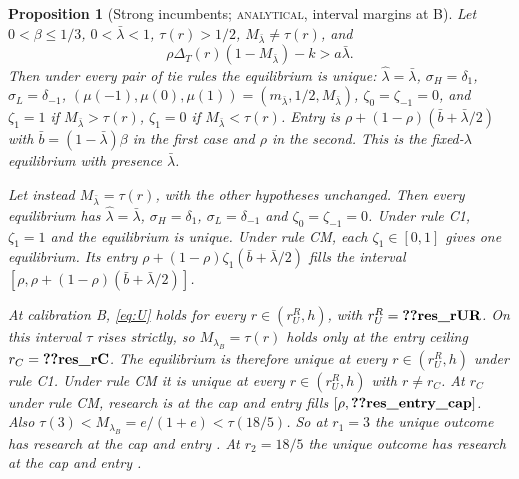 \documentclass[12pt]{article}
\newtheorem{proposition}{Proposition}
\theoremstyle{definition}
\theoremstyle{remark}
\newcommand{\DT}{\Delta_T}
\newcommand{\lh}{\hat\lambda}
\newcommand{\lb}{\bar\lambda}
\newcommand{\st}[1]{\textsc{#1}}
\begin{document}
\begin{proposition}[Strong incumbents; \st{analytical}, interval margins at B]\label{prop:strong}
Let $0<\beta\le1/3$, $0<\lb<1$, $\tau(r)>1/2$, $M_{\lb}\ne\tau(r)$, and
\begin{equation}\tag{U}\label{eq:U}
\rho\DT(r)\left(1-M_{\lb}\right)-k>a\lb .
\end{equation}
Then under every pair of tie rules the equilibrium is unique: $\lh=\lb$, $\sigma_H=\delta_1$, $\sigma_L=\delta_{-1}$,
$(\mu(-1),\mu(0),\mu(1))=(m_{\lb},1/2,M_{\lb})$, $\zeta_0=\zeta_{-1}=0$, and $\zeta_1=1$ if $M_{\lb}>\tau(r)$,
$\zeta_1=0$ if $M_{\lb}<\tau(r)$. Entry is $\rho+(1-\rho)(\bar b+\lb/2)$ with $\bar b=(1-\lb)\beta$ in the first case
and $\rho$ in the second. This is the fixed-$\lambda$ equilibrium with presence $\lb$.

Let instead $M_{\lb}=\tau(r)$, with the other hypotheses unchanged. Then every equilibrium has $\lh=\lb$,
$\sigma_H=\delta_1$, $\sigma_L=\delta_{-1}$ and $\zeta_0=\zeta_{-1}=0$. Under rule C1, $\zeta_1=1$ and the equilibrium
is unique. Under rule CM, each $\zeta_1\in[0,1]$ gives one equilibrium. Its entry
$\rho+(1-\rho)\zeta_1(\bar b+\lb/2)$ fills the interval $[\rho,\rho+(1-\rho)(\bar b+\lb/2)]$.

At calibration B, \eqref{eq:U} holds for every $r\in(r_U^R,h)$, with $r_U^R=\reg{res_rUR}$. On this interval
$\tau$ rises strictly, so $M_{\lambda_B}=\tau(r)$ holds only at the entry ceiling $r_C=\reg{res_rC}$. The
equilibrium is therefore unique at every $r\in(r_U^R,h)$ under rule C1. Under rule CM it is unique at every
$r\in(r_U^R,h)$ with $r\neq r_C$. At $r_C$ under rule CM, research is at the cap and entry fills
$[\rho,\reg{res_entry_cap}]$. Also $\tau(3)<M_{\lambda_B}=e/(1+e)<\tau(18/5)$. So at $r_1=3$ the unique outcome
has research at the cap and entry . At $r_2=18/5$ the unique outcome has research at the cap and
entry .
\end{proposition}
\end{document}
